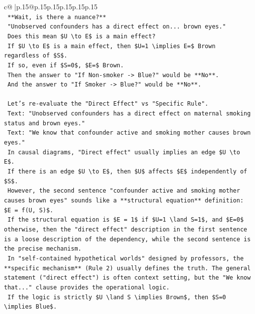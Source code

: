 \documentclass{article}
\begin{document}
{\begin{supertabular}{c@{$\;$}|p{.15\linewidth}@{}p{.15\linewidth}p{.15\linewidth}p{.15\linewidth}p{.15\linewidth}p{.15\linewidth}}
{{{\\ 
\texttt{    **Wait, is there a nuance?**} \\
\texttt{    "Unobserved confounders has a direct effect on... brown eyes."} \\
\texttt{    Does this mean \$U \textbackslash{}to E\$ is a main effect?} \\
\texttt{    If \$U \textbackslash{}to E\$ is a main effect, then \$U=1 \textbackslash{}implies E=\$ Brown regardless of \$S\$.} \\
\texttt{    If so, even if \$S=0\$, \$E=\$ Brown.} \\
\texttt{    Then the answer to "If Non{-}smoker {-}> Blue?" would be **No**.} \\
\texttt{    And the answer to "If Smoker {-}> Blue?" would be **No**.} \\
\\ 
\texttt{    Let's re{-}evaluate the "Direct Effect" vs "Specific Rule".} \\
\texttt{    Text: "Unobserved confounders has a direct effect on maternal smoking status and brown eyes."} \\
\texttt{    Text: "We know that confounder active and smoking mother causes brown eyes."} \\
\texttt{    In causal diagrams, "Direct effect" usually implies an edge \$U \textbackslash{}to E\$.} \\
\texttt{    If there is an edge \$U \textbackslash{}to E\$, then \$U\$ affects \$E\$ independently of \$S\$.} \\
\texttt{    However, the second sentence "confounder active and smoking mother causes brown eyes" sounds like a **structural equation** definition: \$E = f(U, S)\$.} \\
\texttt{    If the structural equation is \$E = 1\$ if \$U=1 \textbackslash{}land S=1\$, and \$E=0\$ otherwise, then the "direct effect" description in the first sentence is a loose description of the dependency, while the second sentence is the precise mechanism.} \\
\texttt{    In "self{-}contained hypothetical worlds" designed by professors, the **specific mechanism** (Rule 2) usually defines the truth. The general statement ("direct effect") is often context setting, but the "We know that..." clause provides the operational logic.} \\
\texttt{    If the logic is strictly \$U \textbackslash{}land S \textbackslash{}implies Brown\$, then \$S=0 \textbackslash{}implies Blue\$.} \\
}}}
\end{supertabular}}
\end{document}
